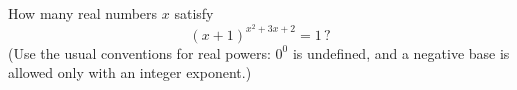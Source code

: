 How many real numbers $x$ satisfy
\[
(x+1)^{x^2+3x+2}=1\,?
\]
(Use the usual conventions for real powers: $0^0$ is undefined, and a negative base is allowed only with an integer exponent.)
